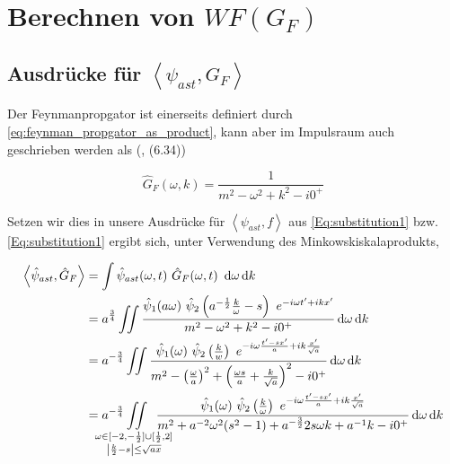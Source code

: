\section{\texorpdfstring{Berechnen von $WF(G_F)$}
        {Berechnen von WF(Gf)}} %
\label{sec:berechnen_von_}

\subsection{\texorpdfstring{Ausdrücke für $\left< \psi_{ast}, G_F\right>$}
        {Ausdrücke für psi ast, gf}} %
\label{sec:psiast_gf}

Der Feynmanpropgator ist einerseits definiert durch \cref{eq:feynman_propgator_as_product}, kann aber im Impulsraum auch geschrieben werden als (\textcite{Schwartz2014}, (6.34))

\begin{equation}
\label{eq:gf}
    \hat G_F(\omega, k) = \frac{1}{m^2 - \omega^2 + k^2 - i 0^+}
\end{equation}

Setzen wir dies in unsere Ausdrücke für $\left< \psi_{ast}, f\right>$ aus \eqref{Eq:substitution1}
bzw. \eqref{Eq:substitution1} ergibt sich, unter Verwendung des Minkowskiskalaprodukts,

\begin{align}
\left< \hat\psi_{ast}, \hat G_F \right> &=
    \int \hat \psi_{ast}(\omega, t) ~\hat G_F(\omega, t) ~\d \omega \d k
    \nonumber \\
    &=
    a^{\frac{3}{4}} \iint \frac{
        \hat \psi_1 (a \omega)
        ~\hat \psi_2 \left(a^{-\frac{1}{2}}\frac{k}{\omega} - s\right)
        ~ e^{-i\omega t' + i k x'}
    }
    {
        m^2 - \omega^2 + k^2 - i 0^+
    }
    \d \omega \d k
    \nonumber \\
    &=
    a^{-\frac{3}{4}} \iint \frac{
        \hat\psi_1(\omega)
        ~\hat \psi_2\left(\tfrac{k}{w}\right)
        ~e^{-i \omega \frac{t' - sx'}{a} + ik \frac{x'}{\sqrt{a}}}
    }
    {
        m^2 - \left(\frac{\omega}{a}\right)^2
        + \left(\frac{\omega s}{a} + \frac{k}{\sqrt{a}}\right)^2 - i0^+
    }
    \d \omega \d k \nonumber \\
    &=
    a^{-\frac{3}{4}}
    \kern -2em \iint
    \limits_{
    \substack{
        \omega \in [-2, -\frac{1}{2}]\cup[\frac{1}{2},2] \\
        \left|\frac{k}{2}-s\right| \leq \sqrt{ax}
        }
    }
    \kern -1.5em
    \frac{
        \hat\psi_1(\omega)
        ~\hat \psi_2\left(\tfrac{k}{\omega}\right)
        ~e^{-i \omega \frac{t' - sx'}{a} + ik \frac{x'}{\sqrt{a}}}
    }
    {
        m^2 + a^{-2} \omega^2 (s^2 - 1) + a^{-\frac{3}{2}} 2 s \omega k + a^{-1} k  - i0^+
    }
    \d \omega \d k
    \label{eq:psi_ast_gf_1}
\end{align}

